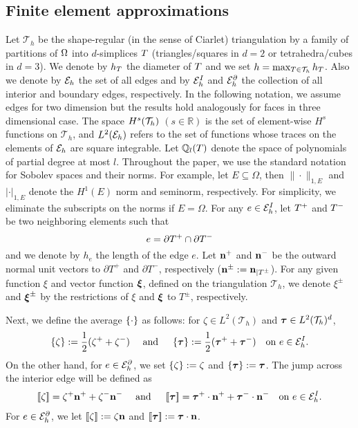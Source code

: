 \documentclass{article}
\begin{document}
\subsection{Finite element approximations}
Let $\mathcal{T}_h$ be the shape-regular (in the sense of Ciarlet)  triangulation by a family of partitions of $\Omega$ into $d$-simplices $T$ (triangles/squares in $d=2$ or tetrahedra/cubes in $d=3$). We denote by $h_{T}$ the diameter of $T$ and we set $h=\max_{T \in \mathcal{T}_h} h_{T}$.  
Also we denote by ${{\mathcal E}_h}$ the set of all edges and by ${{\mathcal E}^{I}_h}$ and ${{\mathcal E}^{\partial}_h}$ the collection of all interior and boundary edges, respectively. 
In the following notation, we assume edges for two dimension but the results hold analogously for faces in three dimensional case.
The space $H^{s}(\mathcal{T}_h)$ $(s\in \mathbb{R})$ is the set of element-wise $H^{s}$ functions on $\mathcal{T}_h$, and $L^{2}({{\mathcal E}_h})$ refers to the set of functions whose traces on the elements of ${{\mathcal E}_h}$ are square integrable. Let $\mathbb{Q}_l(T)$ denote the space of polynomials of partial degree at most $l$. 
Throughout the paper, we use the standard notation for Sobolev spaces and their norms. For example, let $E \subseteq \Omega$, then $\|\cdot\|_{1,E}$ and $|\cdot|_{1,E}$ denote the $H^1(E)$ norm and seminorm, respectively. 
For simplicity, we eliminate the subscripts on the norms if $E = \Omega$.
For any $e \in {{\mathcal E}^{I}_h}$, let $T^{+}$ and $T^{-}$ be two neighboring elements such that  
$$
e = \partial T^{+}\cap \partial T^{-}
$$
and we denote by $h_{e}$ the length of the edge $e$. 
Let ${\bf n}^{+}$ and ${\bf n}^{-}$ be the outward normal unit vectors to  $\partial T^+$ and $\partial T^-$, respectively (${\bf n}^{\pm} :={\bf n}_{|T^{\pm}}$). 
For any given function $\xi$ and vector function ${\boldsymbol \xi}$, defined on the triangulation $\mathcal{T}_h$, we denote $\xi^{\pm}$ and ${\boldsymbol \xi}^{\pm}$ by the restrictions of $\xi$ and ${\boldsymbol \xi}$ to $T^\pm$, respectively. 

Next, we define the  average $\left\{ \cdot \right\}$ as follows: for $\zeta \in L^2(\mathcal{T}_h)$ and ${\boldsymbol {\tau}} \in L^2(\mathcal{T}_h)^d$,
\begin{equation}\label{av-w}
\left\{ \zeta \right\} := \frac{1}{2} (\zeta^+ + \zeta^- )
\quad \mbox{ and } \quad 
\left\{ {\boldsymbol {\tau}} \right\} := \frac{1}{2} ({\boldsymbol {\tau}}^+ +   {\boldsymbol {\tau}}^-) \quad \mbox{on } e\in
{{\mathcal E}^{I}_h}.
\end{equation}
On the other hand, for $e \in {{\mathcal E}^{\partial}_h}$, we set $\left\{ \zeta \right\} :=   \zeta$ and $\left\{ {\boldsymbol {\tau}} \right\} :=  {\boldsymbol {\tau}}$. 
The jump across the interior edge will be defined as 
\begin{align*}
\left\lbrack\!\left\lbrack \zeta \right\rbrack\!\right\rbrack = \zeta^+{\bf n}^++\zeta^-{\bf n}^- \quad \mbox{ and } \quad \left\lbrack\!\left\lbrack {\boldsymbol {\tau}} \right\rbrack\!\right\rbrack = {\boldsymbol {\tau}}^+\cdot{\bf n}^+ + {\boldsymbol {\tau}}^-\cdot{\bf n}^- \quad \mbox{on } e\in {{\mathcal E}^{I}_h}. 
\end{align*}
For  $e \in {{\mathcal E}^{\partial}_h}$, we let $\left\lbrack\!\left\lbrack \zeta \right\rbrack\!\right\rbrack :=  \zeta {\bf n}$ and $\left\lbrack\!\left\lbrack {\boldsymbol {\tau}} \right\rbrack\!\right\rbrack :=  {\boldsymbol {\tau}} \cdot {\bf n}$. 
\end{document}
